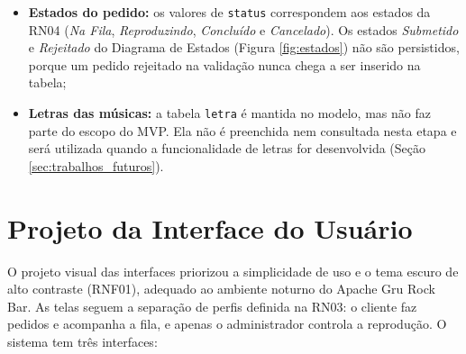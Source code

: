 \begin{itemize}
  \item \textbf{Estados do pedido:} os valores de \texttt{status} correspondem aos estados da RN04 (\textit{Na Fila}, \textit{Reproduzindo}, \textit{Concluído} e \textit{Cancelado}). Os estados \textit{Submetido} e \textit{Rejeitado} do Diagrama de Estados (Figura \ref{fig:estados}) não são persistidos, porque um pedido rejeitado na validação nunca chega a ser inserido na tabela;
  \item \textbf{Letras das músicas:} a tabela \texttt{letra} é mantida no modelo, mas não faz parte do escopo do MVP. Ela não é preenchida nem consultada nesta etapa e será utilizada quando a funcionalidade de letras for desenvolvida (Seção \ref{sec:trabalhos_futuros}).
\end{itemize}

\section{Projeto da Interface do Usuário}

O projeto visual das interfaces priorizou a simplicidade de uso e o tema escuro de alto contraste (RNF01), adequado ao ambiente noturno do Apache Gru Rock Bar. As telas seguem a separação de perfis definida na RN03: o cliente faz pedidos e acompanha a fila, e apenas o administrador controla a reprodução. O sistema tem três interfaces:

